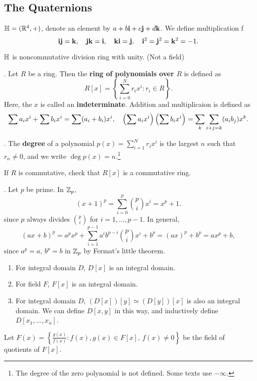 \subsection*{The Quaternions}

\(\bb{H} = (\R^4, +)\), denote an element by \(a + b\bf{i} + c\bf{j} + d\bf{k}\). We define multiplication f
\[
    \bf{ij = k},\quad \bf{jk = i},\quad \bf{ki = j},\quad \bf{i}^2 = \bf{j}^2 = \bf{k}^2 = -1.
\]

\(\bb{H}\) is noncommutative division ring with unity. (Not a field)

\setcounter{topic}{21}

.  Let \(R\) be a ring. Then the \textbf{ring of polynomials over \(R\)} is defined as
\[
    R[x] = \left\{\sum_{i=0}^N r_ix^i : r_i \in R \right\}.
\]
Here, the \(x\) is called an \textbf{indeterminate}. Addition and multiplicaion is defined as
\[
    \sum a_i x^i + \sum b_i x^i = \sum (a_i + b_i) x^i, \quad \paren{\sum a_i x^i} \paren{\sum b_i x^i} = \sum_k \sum_{i + j = k} (a_i b_j) x^k.
\]

.  The \textbf{degree} of a polynomial \(p(x) = \sum_{i=1}^N r_i x^i\) is the largest \(n\) such that \(r_n \neq 0\), and we write \(\deg p(x) = n\).\footnote{The degree of the zero polynomial is not defined. Some texts use \(-\infty\).}

\rmk If \(R\) is commutative, check that \(R[x]\) is a commutative ring.

\ex. Let \(p\) be prime. In \(\Z_p\),
\[
    (x + 1)^p = \sum_{i=0}^p {p \choose i} x^i = x^p + 1.
\]
since \(p\) always divides \({p \choose i}\) for \(i = 1, \dots, p - 1\). In general,
\[
    (ax + b)^p = a^px^p + \sum_{i=1}^{p-1} a^ib^{p-i}{p \choose i} x^i + b^p = (ax)^p + b^p = ax^p + b,
\]
since \(a^p = a\), \(b^p = b\) in \(\Z_p\) by Fermat's little theorem.

\rmk
\begin{enumerate}
    \item For integral domain \(D\), \(D[x]\) is an integral domain.
    \item For field \(F\), \(F[x]\) is an integral domain.
    \item For integral domain \(D\), \((D[x])[y] \simeq (D[y])[x]\) is also an integral domain. We can define \(D[x, y]\) in this way, and inductively define \(D[x_1, \dots, x_n]\).
\end{enumerate}

\notation Let \(F(x) = \left\{\frac{g(x)}{f(x)} : f(x), g(x) \in F[x],\, f(x) \neq 0\right\}\) be the field of quotients of \(F[x]\).

